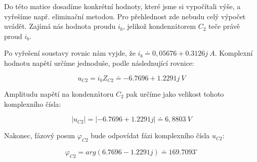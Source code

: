 Do této matice dosadíme konkrétní hodnoty, které jsme si vypočítali výše, a vyřešíme např. eliminační metodou. Pro přehlednost zde nebudu celý výpočet uvádět. Zajímá nás hodnota proudu $i_b$, jelikož kondenzátorem $C_2$ teče právě proud $i_b$. 

Po vyřešení soustavy rovnic nám vyjde, že $i_b \doteq 0,05676 + 0.3126 j \: A$. Komplexní hodnotu napětí určíme jednoduše, podle následnující rovnice: 

$$ u_{C2} = i_b Z_{C2} \doteq - 6.7696 + 1.2291j \: V $$

Amplitudu napětí na kondenzátoru $C_2$ pak určíme jako velikost tohoto komplexního čísla:

$$ |u_{C2}| = |- 6.7696 + 1.2291j| \doteq 6,8803 \: V $$

Nakonec, fázový posun $\varphi_{C2}$ bude odpovídat fázi komplexního čísla $u_{C2}$:

$$ \varphi_{C2} = arg(6.7696 - 1.2291j) \doteq 169.7093 ^\circ $$
